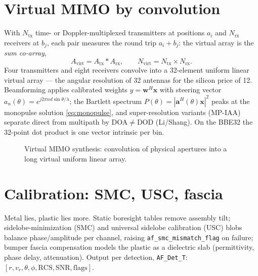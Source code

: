 \documentclass[11pt,oneside]{book}
\begin{document}
\section{Virtual MIMO by convolution}
\label{sec:mimo}

With $N_{\mathrm{tx}}$ time- or Doppler-multiplexed transmitters at
positions $a_i$ and $N_{\mathrm{rx}}$ receivers at $b_j$, each pair measures
the round trip $a_i+b_j$: the virtual array is the \emph{sum co-array},
\begin{equation}
A_{\mathrm{virt}} = A_{\mathrm{tx}} \ast A_{\mathrm{rx}},\qquad
N_{\mathrm{virt}} = N_{\mathrm{tx}}\times N_{\mathrm{rx}}.
\label{eq:mimo-conv}
\end{equation}
Four transmitters and eight receivers convolve into a 32-element uniform
linear virtual array --- the angular resolution of 32 antennas for the
silicon price of 12. Beamforming applies calibrated weights
$y=\mathbf{w}^H\mathbf{x}$ with steering vector
$a_n(\theta)=e^{j2\pi nd\sin\theta/\lambda}$; the Bartlett spectrum
$P(\theta)=|\mathbf{a}^H(\theta)\mathbf{x}|^2$ peaks at the monopulse
solution \cref{eq:monopulse}, and super-resolution variants (MP-IAA)
separate direct from multipath by DOA$\ne$DOD (Li/Shang). On the BBE32 the
$32$-point dot product is one vector intrinsic per bin.

\begin{figure}[htbp]
\centering
{}
\caption{Virtual MIMO synthesis: convolution of physical apertures into a
long virtual uniform linear array.}
\label{fig:mimo}
\end{figure}

\section{Calibration: SMC, USC, fascia}
\label{sec:calib}

Metal lies, plastic lies more. Static boresight tables remove assembly tilt;
sidelobe-minimization (SMC) and universal sidelobe calibration (USC) blobs
balance phase/amplitude per channel, raising
\texttt{af\_smc\_mismatch\_flag} on failure; bumper fascia compensation
models the plastic as a dielectric slab (permittivity, phase delay,
attenuation). Output per detection, \texttt{AF\_Det\_T}:
$[r,v_r,\theta,\phi,\mathrm{RCS},\mathrm{SNR},\mathrm{flags}]$.
\end{document}
